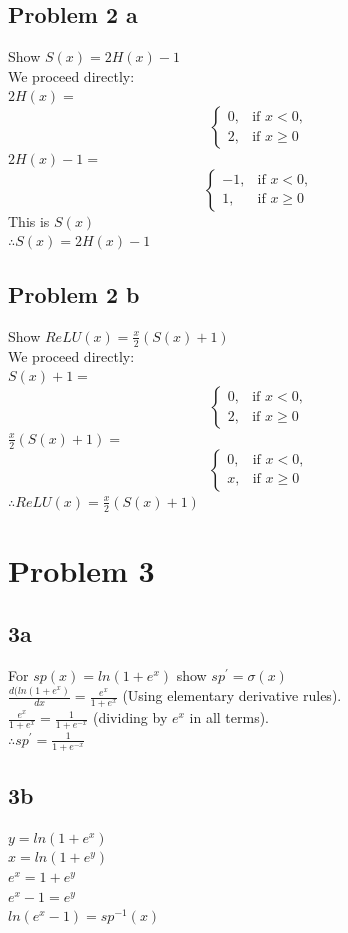 \documentclass[a4paper,12pt]{article}
\begin{document}
\subsection{Problem 2 a}
Show $S(x) = 2H(x)-1$\\
We proceed directly:\\
$2H(x) =$
$$
\begin{cases}
0, &\text{if  }  x < 0,\\
2, &\text{if  }  x \geq 0
\end{cases}
$$
$2H(x) - 1 =$
$$
\begin{cases}
-1, &\text{if  }  x < 0,\\
1, &\text{if  }  x \geq 0
\end{cases}
$$
This is $S(x)$\\
$\therefore S(x)=2H(x)-1$

\subsection{Problem 2 b}
Show $ReLU(x) = \frac{x}{2}(S(x)+1)$\\
We proceed directly:\\
$S(x)+1=$
$$
\begin{cases}
0, &\text{if  }  x < 0,\\
2, &\text{if  }  x \geq 0
\end{cases}
$$
$\frac{x}{2}(S(x)+1) =$\\
$$
\begin{cases}
0, &\text{if  }  x < 0,\\
x, &\text{if  }  x \geq 0
\end{cases}
$$
$\therefore ReLU(x) = \frac{x}{2}(S(x)+1)$


\section{Problem 3}
\subsection{3a}
For $sp(x)=ln(1+e^x)$ show $sp^{'} = \sigma(x)$\\
$\frac{d(ln(1+e^x)}{dx}=\frac{e^x}{1+e^x}$ (Using elementary derivative rules).\\
$\frac{e^x}{1+e^x} = \frac{1}{1+e^{-x}}$ (dividing by $e^x$ in all terms).\\
$\therefore sp^{'} = \frac{1}{1+e^{-x}}$
\subsection{3b}
$y=ln(1+e^x)$\\
$x=ln(1+e^y)$\\
$e^x=1+e^y$\\
$e^x-1=e^y$\\
$ln(e^x-1)= sp^{-1}(x)$\\
\end{document}
